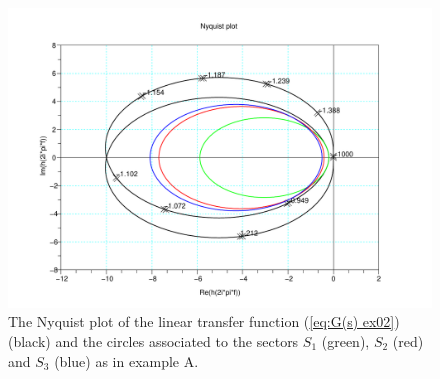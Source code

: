 \documentclass[letterpaper,10pt,twocolumn,journal,final]{IEEEtran}
\begin{document}
\begin{figure}
	\centering
	\includegraphics[width=0.9\columnwidth]{nyquist_ex02}
	\caption{The Nyquist plot of the linear transfer function (\ref{eq:G(s) ex02}) (black) and the circles associated to the sectors $S_1$ (green), $S_2$ (red) and $S_3$ (blue) as in example A.
	\label{fig:nyquist ex 02}}
\end{figure}
\end{document}
